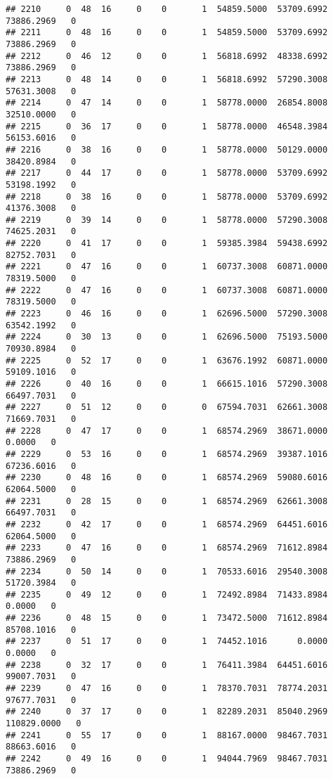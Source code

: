 \documentclass[
]{article}
\begin{document}
\begin{enumerate}
\begin{verbatim}
## 2210     0  48  16     0    0       1  54859.5000  53709.6992  73886.2969   0
## 2211     0  48  16     0    0       1  54859.5000  53709.6992  73886.2969   0
## 2212     0  46  12     0    0       1  56818.6992  48338.6992  73886.2969   0
## 2213     0  48  14     0    0       1  56818.6992  57290.3008  57631.3008   0
## 2214     0  47  14     0    0       1  58778.0000  26854.8008  32510.0000   0
## 2215     0  36  17     0    0       1  58778.0000  46548.3984  56153.6016   0
## 2216     0  38  16     0    0       1  58778.0000  50129.0000  38420.8984   0
## 2217     0  44  17     0    0       1  58778.0000  53709.6992  53198.1992   0
## 2218     0  38  16     0    0       1  58778.0000  53709.6992  41376.3008   0
## 2219     0  39  14     0    0       1  58778.0000  57290.3008  74625.2031   0
## 2220     0  41  17     0    0       1  59385.3984  59438.6992  82752.7031   0
## 2221     0  47  16     0    0       1  60737.3008  60871.0000  78319.5000   0
## 2222     0  47  16     0    0       1  60737.3008  60871.0000  78319.5000   0
## 2223     0  46  16     0    0       1  62696.5000  57290.3008  63542.1992   0
## 2224     0  30  13     0    0       1  62696.5000  75193.5000  70930.8984   0
## 2225     0  52  17     0    0       1  63676.1992  60871.0000  59109.1016   0
## 2226     0  40  16     0    0       1  66615.1016  57290.3008  66497.7031   0
## 2227     0  51  12     0    0       0  67594.7031  62661.3008  71669.7031   0
## 2228     0  47  17     0    0       1  68574.2969  38671.0000      0.0000   0
## 2229     0  53  16     0    0       1  68574.2969  39387.1016  67236.6016   0
## 2230     0  48  16     0    0       1  68574.2969  59080.6016  62064.5000   0
## 2231     0  28  15     0    0       1  68574.2969  62661.3008  66497.7031   0
## 2232     0  42  17     0    0       1  68574.2969  64451.6016  62064.5000   0
## 2233     0  47  16     0    0       1  68574.2969  71612.8984  73886.2969   0
## 2234     0  50  14     0    0       1  70533.6016  29540.3008  51720.3984   0
## 2235     0  49  12     0    0       1  72492.8984  71433.8984      0.0000   0
## 2236     0  48  15     0    0       1  73472.5000  71612.8984  85708.1016   0
## 2237     0  51  17     0    0       1  74452.1016      0.0000      0.0000   0
## 2238     0  32  17     0    0       1  76411.3984  64451.6016  99007.7031   0
## 2239     0  47  16     0    0       1  78370.7031  78774.2031  97677.7031   0
## 2240     0  37  17     0    0       1  82289.2031  85040.2969 110829.0000   0
## 2241     0  55  17     0    0       1  88167.0000  98467.7031  88663.6016   0
## 2242     0  49  16     0    0       1  94044.7969  98467.7031  73886.2969   0

\end{verbatim}
\end{enumerate}
\end{document}
